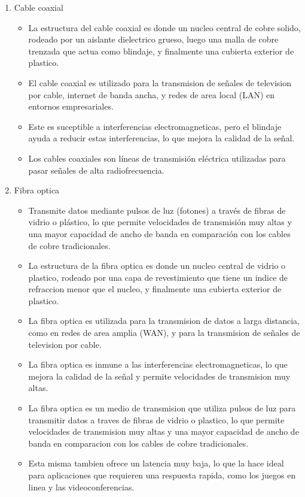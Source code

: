 \documentclass[a4paper,12pt]{article}
\begin{document}
\begin{enumerate}
    \item Cable coaxial
    \begin{itemize}
        \item La estructura del cable coaxial es donde un nucleo central de cobre solido, rodeado por un aislante dielectrico grueso, luego una malla de cobre trenzada que actua como blindaje, y finalmente una cubierta exterior de plastico.
        \item El cable coaxial es utilizado para la transmision de señales de television por cable, internet de banda ancha, y redes de area local (LAN) en entornos empresariales.
        \item Este es suceptible a interferencias electromagneticas, pero el blindaje ayuda a reducir estas interferencias, lo que mejora la calidad de la señal.
        \item Los cables coaxiales son líneas de transmisión eléctrica utilizadas para pasar señales de alta radiofrecuencia.
    \end{itemize}
    \item Fibra optica
    \begin{itemize}
        \item Transmite datos mediante pulsos de luz (fotones) a través de fibras de vidrio o plástico, lo que permite velocidades de transmisión muy altas y una mayor capacidad de ancho de banda en comparación con los cables de cobre tradicionales.
        \item La estructura de la fibra optica es donde un nucleo central de vidrio o plastico, rodeado por una capa de revestimiento que tiene un indice de refraccion menor que el nucleo, y finalmente una cubierta exterior de plastico.
        \item La fibra optica es utilizada para la transmision de datos a larga distancia, como en redes de area amplia (WAN), y para la transmision de señales de television por cable.
        \item La fibra optica es inmune a las interferencias electromagneticas, lo que mejora la calidad de la señal y permite velocidades de transmision muy altas.
        \item La fibra optica es un medio de transmision que utiliza pulsos de luz para transmitir datos a traves de fibras de vidrio o plastico, lo que permite velocidades de transmision muy altas y una mayor capacidad de ancho de banda en comparacion con los cables de cobre tradicionales.
        \item Esta misma tambien ofrece un latencia muy baja, lo que la hace ideal para aplicaciones que requieren una respuesta rapida, como los juegos en linea y las videoconferencias.
        
    \end{itemize}
\end{enumerate}
\newpage
\end{document}
